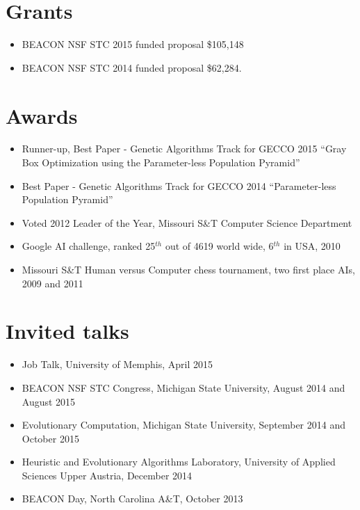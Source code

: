 \documentclass[a4paper,11pt]{article}
\begin{document}
\begin{other-publications}
\end{other-publications}

\section{Grants}
\begin{itemize}
\item BEACON NSF STC 2015 funded proposal \$105,148
\item BEACON NSF STC 2014 funded proposal \$62,284.
\end{itemize}

\section{Awards}
\begin{itemize}
\item     Runner-up, Best Paper - Genetic Algorithms Track for GECCO 2015 ``Gray Box Optimization using the Parameter-less Population Pyramid''
\item     Best Paper - Genetic Algorithms Track for GECCO 2014 ``Parameter-less Population Pyramid''
\item     Voted 2012 Leader of the Year, Missouri S\&T Computer Science Department
\item     Google AI challenge, ranked 25$^{th}$ out of 4619 world wide, 6$^{th}$ in USA, 2010
\item     Missouri S\&T Human versus Computer chess tournament, two first place AIs, 2009 and 2011
\end{itemize}

\section{Invited talks}
\begin{itemize}
\item Job Talk, University of Memphis, April 2015
\item BEACON NSF STC Congress, Michigan State University, August 2014 and August 2015
\item Evolutionary Computation, Michigan State University, September 2014 and October 2015
\item Heuristic and Evolutionary Algorithms Laboratory, University of Applied Sciences Upper Austria, December 2014
\item BEACON Day, North Carolina A\&T, October 2013
\end{itemize}
\end{document}
